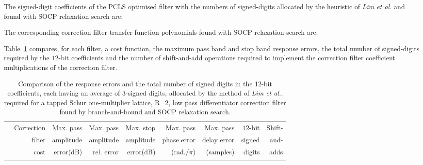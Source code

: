 \documentclass[a4paper,twoside,10pt,english]{article}
\begin{document}
The signed-digit coefficients of the PCLS optimised filter with the
numbers of signed-digits allocated by the heuristic of \emph{Lim et al.} and
found with SOCP relaxation search are:
\begin{small}


\end{small}
The corresponding correction filter transfer function polynomials found with
SOCP relaxation search are:
\begin{small}


\end{small}

Table~\ref{tab:Comp-schurOneMlattice-lowpass-diff-R2-12-nbits-cost}
compares, for each filter, a cost function, the maximum pass band and stop band
response errors, the total number of signed-digits required by the $12$-bit 
coefficients and the number of shift-and-add operations required to implement
the correction filter coefficient multiplications of the correction filter.

\begin{table}
\centering
\begin{threeparttable}
\begin{tabular}{lrrrrrrrr} \\ \toprule
&Correction&Max. pass&Max. pass &Max. stop&Max. pass   &Max. pass  &$12$-bit&Shift-\\
&filter    &amplitude&amplitude &amplitude&phase error &delay error&signed  &and- \\
&cost      &error(dB)&rel. error&error(dB)&(rad./$\pi$)&(samples)  &digits  &adds \\
\midrule

\\ \bottomrule
\end{tabular}
\end{threeparttable}
\caption[Comparison of low pass differentiator filter fixed point implementations]
{Comparison of the response errors and the total number of signed digits in the
  12-bit coefficients, each having an average of 3-signed digits, allocated by
  the method of \emph{Lim et al.}, required for a tapped Schur one-multiplier
  lattice, R=2, low pass differentiator correction filter found by
  branch-and-bound and SOCP relaxation search.}
\label{tab:Comp-schurOneMlattice-lowpass-diff-R2-12-nbits-cost}
\end{table}
\end{document}
